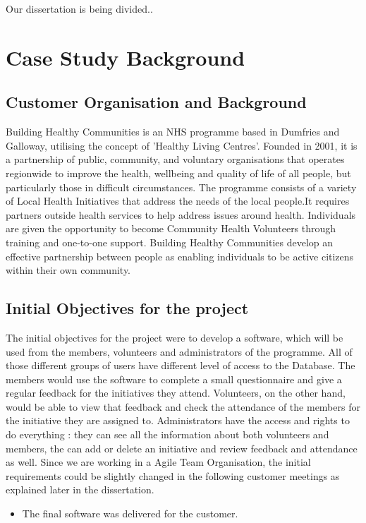 \documentclass{l3proj}
\begin{document}

Our dissertation is being divided..

\section{Case Study Background}

\subsection{Customer Organisation and Background}
\label{customer}

Building Healthy Communities is an NHS programme based in Dumfries and Galloway, utilising the concept of 'Healthy Living Centres'. Founded in 2001, it is a partnership of public, community, and voluntary organisations that operates regionwide to improve the health, wellbeing and quality of life of all people, but particularly those in difficult circumstances. The programme consists of a variety of Local Health Initiatives that address the needs of the local people.It requires partners outside health services to help address issues around health.  Individuals are given the opportunity to become Community Health Volunteers through training and one-to-one support. Building Healthy Communities develop an effective partnership between people as enabling individuals to be active citizens within their own community.

\subsection{Initial Objectives for the project}
\label{objectives}

The initial objectives for the project were to develop a software, which will be used from the members, volunteers and administrators of the programme. All of those different groups of users have different level of access to the Database. The members would use the software to  complete a small questionnaire and give a regular feedback for the initiatives they attend. Volunteers, on the other hand, would be able to view that feedback and check the attendance of the members for the initiative they are assigned to. Administrators have the access and rights to do everything : they can see all the information about both volunteers and members, the can add or delete an initiative and review feedback and attendance as well. Since we are working in a Agile Team Organisation, the initial requirements could be slightly changed in the following customer meetings as explained later in the dissertation.
\begin{itemize}
\item The final software was delivered for the customer.
\end{itemize}
\end{document}
